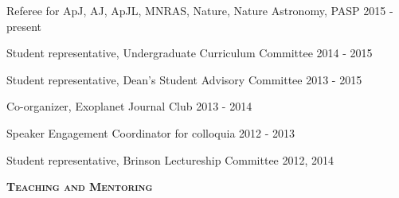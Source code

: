 \documentclass[12pt,letterpaper]{article}
\begin{document}
\begin{compactitem}[]
\item Referee for ApJ, AJ, ApJL, MNRAS, Nature, Nature Astronomy, PASP \hfill 2015 - present
\item Student representative, Undergraduate Curriculum Committee \hfill 2014 - 2015
\item Student representative, Dean's Student Advisory Committee \hfill 2013 - 2015
\item Co-organizer, Exoplanet Journal Club \hfill 2013 - 2014
\item Speaker Engagement Coordinator for colloquia \hfill 2012 - 2013
\item Student representative, Brinson Lectureship Committee \hfill 2012, 2014
\end{compactitem}


\vspace{7mm}
\textbf{\textsc{Teaching and Mentoring}} 
\end{document}
